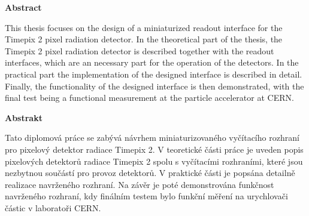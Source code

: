 \thispagestyle{plain}

\begin{center}
	\Large
	\textbf{Abstract}
\end{center}
This thesis focuses on the design of a miniaturized readout interface for the Timepix 2 pixel radiation detector. In the theoretical part of the thesis, the Timepix 2 pixel radiation detector is described together with the readout interfaces, which are an necessary part for the operation of the detectors. In the practical part the implementation of the designed interface is described in detail. Finally, the functionality of the designed interface is then demonstrated, with the final test being a functional measurement at the particle accelerator at CERN.


\hfill

\begin{center}
	\Large
	\textbf{Abstrakt}
\end{center}

Tato diplomová práce se zabývá návrhem miniaturizovaného vyčítacího rozhraní pro pixelový detektor radiace Timepix 2. V teoretické části práce je uveden popis pixelových detektorů radiace Timepix 2 spolu s vyčítacími rozhraními, které jsou nezbytnou součástí pro provoz detektorů. V praktické části je popsána detailně realizace navrženého rozhraní. Na závěr je poté demonstrována funkčnost navrženého rozhraní, kdy finálním testem bylo funkční měření na urychlovači částic v laboratoři CERN.

